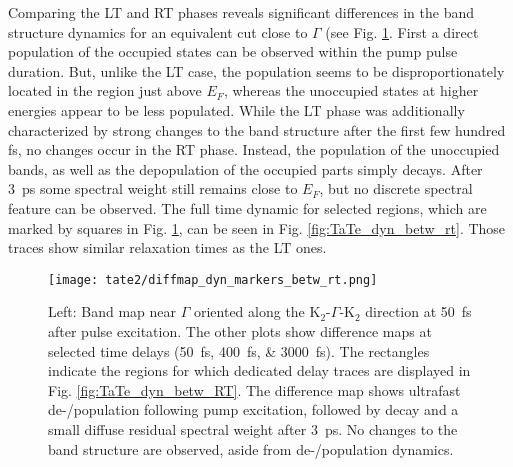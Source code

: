 Comparing the LT and RT phases reveals significant differences in the band structure dynamics for an equivalent cut close to $\Gamma$ (see Fig. \ref{fig:TaTe_bandmap_dyn_betw_rt}.
First a direct population of the occupied states can be observed within the pump pulse duration.
But, unlike the LT case, the population seems to be disproportionately located in the region just above $E_F$, whereas the unoccupied states at higher energies appear to be less populated.
While the LT phase was additionally characterized by strong changes to the band structure after the first few hundred \unit{\femto\second}, no changes occur in the RT phase.
Instead, the population of the unoccupied bands, as well as the depopulation of the occupied parts simply decays.
After \qty{3}{\pico\second} some spectral weight still remains close to $E_F$, but no discrete spectral feature can be observed.
The full time dynamic for selected regions, which are marked by squares in Fig. \ref{fig:TaTe_bandmap_dyn_betw_rt}, can be seen in Fig. \ref{fig:TaTe_dyn_betw_rt}.
Those traces show similar relaxation times as the LT ones.

\begin{figure}[t!]
	\centering
	\texttt{[image: tate2/diffmap\_dyn\_markers\_betw\_rt.png]}
	\caption{Left: Band map near $\Gamma$ oriented along the K$_2$-$\Gamma$-K$_2$ direction at \qty{50}{\femto\second} after pulse excitation. The other plots show difference maps at selected time delays (\qtylist{50;400;3000}{\femto\second}). The rectangles indicate the regions for which dedicated delay traces are displayed in Fig. \ref{fig:TaTe_dyn_betw_RT}. The difference map shows ultrafast de-/population following pump excitation, followed by decay and a small diffuse residual spectral weight after \qty{3}{\pico\second}. No changes to the band structure are observed, aside from de-/population dynamics.}
	\label{fig:TaTe_bandmap_dyn_betw_rt}
\end{figure}

